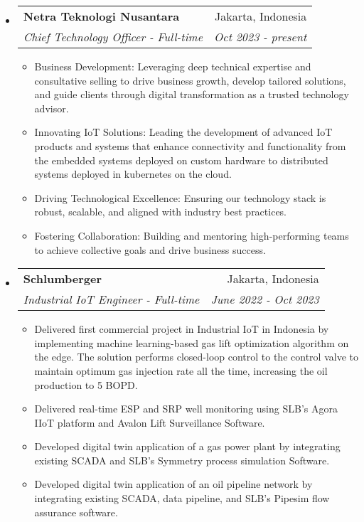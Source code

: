 \documentclass[letterpaper,9pt]{article}
\makeatletter
\newcommand{\resitem}[1]{\item #1 \vspace{-2pt}}
\newcommand{\ressubheading}[4]{
\begin{tabular*}{7.0in}{l@{\cftdotfill{\cftsecdotsep}\extracolsep{\fill}}r}
		\textbf{#1} & #2 \\
        \textit{#3} & \textit{#4} \\
\end{tabular*}\vspace{-6.3pt}}
\makeatother
\begin{document}
\begin{itemize}
  \item
    \ressubheading{Netra Teknologi Nusantara}{Jakarta, Indonesia}{Chief Technology Officer - Full-time}{Oct 2023 - present}
    \begin{itemize}
      \resitem{Business Development: Leveraging deep technical expertise and consultative selling to drive business growth, develop tailored solutions, and guide clients through digital transformation as a trusted technology advisor.}
      \resitem{Innovating IoT Solutions: Leading the development of advanced IoT products and systems that enhance connectivity and functionality from the embedded systems deployed on custom hardware to distributed systems deployed in kubernetes on the cloud.}
      \resitem{Driving Technological Excellence: Ensuring our technology stack is robust, scalable, and aligned with industry best practices.}
      \resitem{Fostering Collaboration: Building and mentoring high-performing teams to achieve collective goals and drive business success.}
    \end{itemize}

  \item
    \ressubheading{Schlumberger}{Jakarta, Indonesia}{Industrial IoT Engineer - Full-time}{June 2022 - Oct 2023}
    \begin{itemize}
      \resitem{Delivered first commercial project in Industrial IoT in Indonesia by implementing machine learning-based gas lift optimization algorithm on the edge. The solution performs closed-loop control to the control valve to maintain optimum gas injection rate all the time, increasing the oil production to 5 BOPD.}
      \resitem{Delivered real-time ESP and SRP well monitoring using SLB's Agora IIoT platform and Avalon Lift Surveillance Software.}
      \resitem{Developed digital twin application of a gas power plant by integrating existing SCADA and SLB's Symmetry process simulation Software.}
      \resitem{Developed digital twin application of an oil pipeline network by integrating existing SCADA, data pipeline, and SLB's Pipesim flow assurance software.}
    \end{itemize}


\end{itemize}
\end{document}
